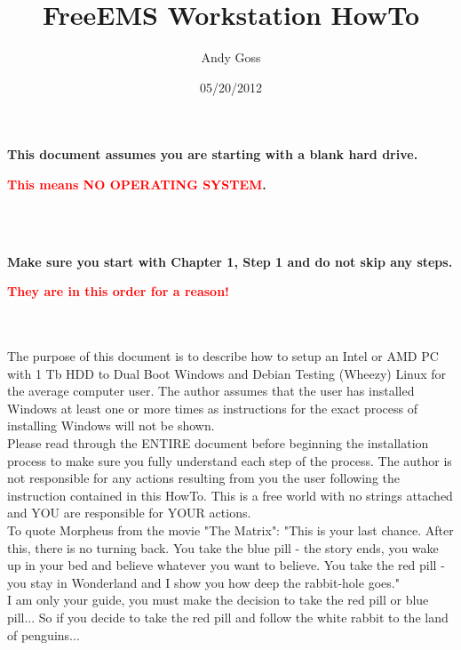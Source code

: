 \documentclass[12pt,notitlepage,onecolumn,oneside,openany]{memoir}
\title{\textsf{FreeEMS Workstation HowTo}}
\author{\textsf{Andy Goss}}
\date{\textsf{05/20/2012}}
\begin{document}
\maketitle

\centerline{\textbf{\textsf{This document assumes you are starting with a blank hard drive.}}} 
\centerline{\textbf{\textsf{\textcolor{red}{This means NO OPERATING SYSTEM}.}}}
\\
\textcolor{white}{\textsf{xyz}}
\\
\centerline{\textbf{\textsf{Make sure you start with Chapter 1, Step 1 and do not skip any steps.}}}
\centerline{\textbf{\textsf{\textcolor{red}{They are in this order for a reason!}}}}
\\
\textcolor{white}{\textsf{xyz2}}
\\
\textsf{The purpose of this document is to describe how to setup an Intel or AMD PC with 1 Tb HDD to Dual Boot Windows and Debian Testing (Wheezy) Linux for the average computer user.  The author assumes that the user has installed Windows at least one or more times as instructions for the exact process of installing Windows will not be shown.} \newline
\\
\textsf{Please read through the ENTIRE document before beginning the installation process to make sure you fully understand each step of the process.  The author is not responsible for any actions resulting from you the user following the instruction contained in this HowTo. This is a free world with no strings attached and YOU are responsible for YOUR actions.} \newline
\\
\textsf{To quote Morpheus from the movie "The Matrix": "This is your last chance. After this, there is no turning back. You take the blue pill - the story ends, you wake up in your bed and believe whatever you want to believe. You take the red pill - you stay in Wonderland and I show you how deep the rabbit-hole goes."} \newline
\\
\textsf{I am only your guide, you must make the decision to take the red pill or blue pill...} \newline
\textsf{So if you decide to take the red pill and follow the white rabbit to the land of penguins...} \newline

\pagebreak 

\tableofcontents

\newpage 
\end{document}
